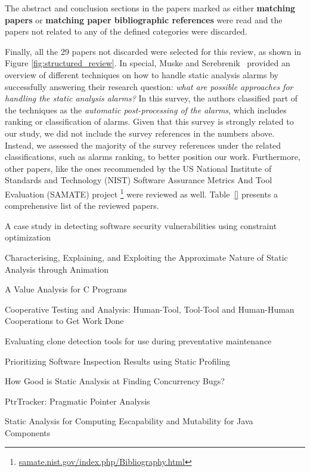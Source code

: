 The abstract and conclusion sections in the papers marked as either
\textbf{matching papers} or \textbf{matching paper bibliographic references} were read and the
papers not related to any of the defined categories were discarded.

Finally, all the 29 papers not discarded were selected for this review, as
shown in Figure \ref{fig:structured_review}. In special, Muske and
Serebrenik~\cite{muske2016survey} provided an overview of different techniques
on how to handle static analysis alarms by successfully answering their
research question: \textit{what are possible approaches for handling the static
analysis alarms?} In this survey, the authors classified part of the techniques
as the \textit{automatic post-processing of the alarms}, which includes ranking
or classification of alarms. Given that this survey is strongly related to our
study, we did not include the survey references in the numbers above. Instead,
we assessed the majority of the survey references under the related
classifications, such as alarms ranking, to better position our work.
Furthermore, other papers, like the ones recommended by the US National
Institute of Standards and Technology (NIST) Software Assurance Metrics And
Tool Evaluation (SAMATE) project
\footnote{\url{samate.nist.gov/index.php/Bibliography.html}} were reviewed as
well. Table~\ref{} presents a comprehensive list of the reviewed papers.


A case study in detecting software security vulnerabilities using constraint optimization~\cite{weber2001case}

Characterising, Explaining, and Exploiting the Approximate Nature of Static Analysis through Animation~\cite{binkley2006characterising}

A Value Analysis for C Programs~\cite{canet2009value}

Cooperative Testing and Analysis: Human-Tool, Tool-Tool and Human-Human Cooperations to Get Work Done~\cite{xie2012cooperative}

Evaluating clone detection tools for use during preventative maintenance~\cite{burd2002evaluating}

Prioritizing Software Inspection Results using Static Profiling~\cite{boogerd2006prioritizing}

How Good is Static Analysis at Finding Concurrency Bugs?~\cite{kester2010good}

PtrTracker: Pragmatic Pointer Analysis~\cite{huuck2013ptrtracker}

Static Analysis for Computing Escapability and Mutability for Java Components~\cite{shi2005static}

